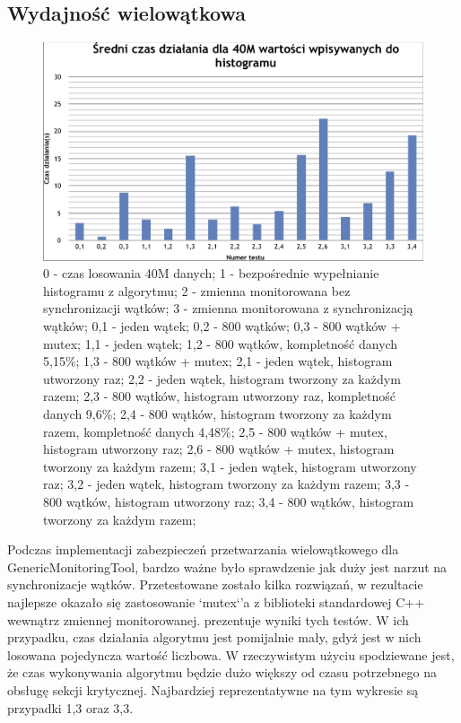\subsection{Wydajność wielowątkowa}

\begin{figure}[!ht]
\centering
\includegraphics[width=1\textwidth]{img/avg_run_time.png}
\caption{
0 - czas losowania 40M danych; 
1 - bezpośrednie wypełnianie histogramu z algorytmu;
2 - zmienna monitorowana bez synchronizacji wątków;
3 - zmienna monitorowana z synchronizacją wątków;
0,1 - jeden wątek;
0,2 - 800 wątków;
0,3 - 800 wątków + mutex;
1,1 - jeden wątek;
1,2 - 800 wątków, kompletność danych 5,15\%;
1,3 - 800 wątków + mutex;
2,1 - jeden wątek, histogram utworzony raz;
2,2 - jeden wątek, histogram tworzony za każdym razem;
2,3 - 800 wątków, histogram utworzony raz, kompletność danych 9,6\%;
2,4 - 800 wątków, histogram tworzony za każdym razem, kompletność danych 4,48\%;
2,5 - 800 wątków + mutex, histogram utworzony raz;
2,6 - 800 wątków + mutex, histogram tworzony za każdym razem;
3,1 - jeden wątek, histogram utworzony raz;
3,2 - jeden wątek, histogram tworzony za każdym razem;
3,3 - 800 wątków, histogram utworzony raz;
3,4 - 800 wątków, histogram tworzony za każdym razem;
}
\label{fig:athena:avgRunTime}
\end{figure}

Podczas implementacji zabezpieczeń przetwarzania wielowątkowego dla GenericMonitoringTool, bardzo ważne było sprawdzenie jak duży jest narzut na synchronizacje wątków. 
Przetestowane zostało kilka rozwiązań, w rezultacie najlepsze okazało się zastosowanie `mutex`'a z biblioteki standardowej C++ wewnątrz zmiennej monitorowanej. 
 prezentuje wyniki tych testów. 
W ich przypadku, czas działania algorytmu jest pomijalnie mały, gdyż jest w nich losowana pojedyncza wartość liczbowa.
W rzeczywistym użyciu spodziewane jest, że czas wykonywania algorytmu będzie dużo większy od czasu potrzebnego na obsługę sekcji krytycznej. 
Najbardziej reprezentatywne na tym wykresie są przypadki 1,3 oraz 3,3.

